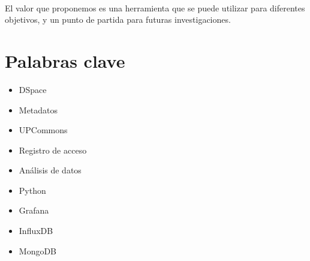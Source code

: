 \noindent \\
El valor que proponemos es una herramienta que se puede utilizar para diferentes objetivos, y un punto de partida para futuras investigaciones.

\clearpage
\section*{Palabras clave}\label{sec:keywords-es}
\begin{multicols}{3}
    \begin{itemize}
        \item DSpace
        \item Metadatos
        \item UPCommons
    \end{itemize}
    \columnbreak
    \begin{itemize}
        \item Registro de acceso
        \item Análisis de datos
        \item Python
    \end{itemize}
    \columnbreak
    \begin{itemize}
        \item Grafana
        \item InfluxDB
        \item MongoDB
    \end{itemize}
\end{multicols}